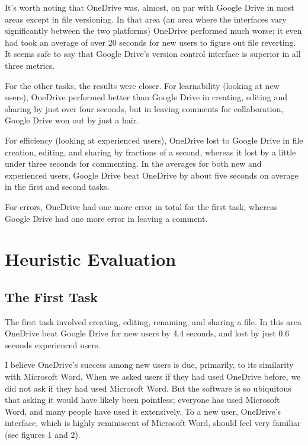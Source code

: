 \documentclass[a4paper,12pt]{article}
\begin{document}
It's worth noting that OneDrive was, almost, on par with Google Drive in most areas except in file versioning. In that area (an area where the interfaces vary significantly between the two platforms) OneDrive performed much worse; it even had took an average of over 20 seconds for new users to figure out file reverting. It seems safe to say that Google Drive's version control interface is superior in all three metrics. 

For the other tasks, the results were closer. For learnability (looking at new users), OneDrive performed better than Google Drive in creating, editing and sharing by just over four seconds, but in leaving comments for collaboration, Google Drive won out by just a hair. 

For efficiency (looking at experienced users), OneDrive lost to Google Drive in file creation, editing, and sharing by fractions of a second, whereas it lost by a little under three seconds for commenting. In the averages for both new and experienced users, Google Drive beat OneDrive by about five seconds on average in the first and second tasks.

For errors, OneDrive had one more error in total for the first task, whereas Google Drive had one more error in leaving a comment.

\section{Heuristic Evaluation}

\subsection{The First Task}

The first task involved creating, editing, renaming, and sharing a file. In this area OneDrive beat Google Drive for new users by 4.4 seconds, and lost by just 0.6 seconds experienced users. 

I believe OneDrive's success among new users is due, primarily, to its similarity with Microsoft Word. When we asked users if they had used OneDrive before, we did not ask if they had used Microsoft Word. But the software is so ubiquitous that asking it would have likely been pointless; everyone has used Microsoft Word, and many people have used it extensively. To a new user, OneDrive's interface, which is highly reminiscent of Microsoft Word, should feel very familiar (see figures 1 and 2).
\end{document}

